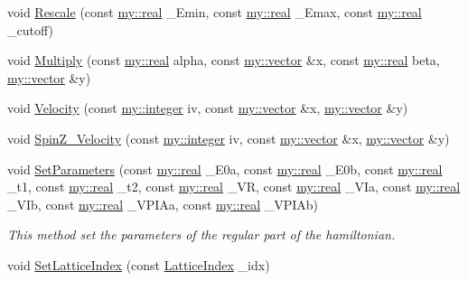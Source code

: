 \begin{DoxyCompactItemize}
\item 
void \hyperlink{classRegularHamiltonian_a47b8742fc581e4bafd1e1f2a5672e603}{Rescale} (const \hyperlink{namespacemy_ad61baeaeda728a4c48dd64f93e44a46c}{my\+::real} \+\_\+\+Emin, const \hyperlink{namespacemy_ad61baeaeda728a4c48dd64f93e44a46c}{my\+::real} \+\_\+\+Emax, const \hyperlink{namespacemy_ad61baeaeda728a4c48dd64f93e44a46c}{my\+::real} \+\_\+cutoff)
\item 
void \hyperlink{classRegularHamiltonian_a8107628da44cb22e0dbafd7c833264ef}{Multiply} (const \hyperlink{namespacemy_ad61baeaeda728a4c48dd64f93e44a46c}{my\+::real} alpha, const \hyperlink{namespacemy_ae5357c26097990af91eec62b547ff125}{my\+::vector} \&x, const \hyperlink{namespacemy_ad61baeaeda728a4c48dd64f93e44a46c}{my\+::real} beta, \hyperlink{namespacemy_ae5357c26097990af91eec62b547ff125}{my\+::vector} \&y)
\item 
void \hyperlink{classRegularHamiltonian_a1b337987086f6768ed170f072528666a}{Velocity} (const \hyperlink{namespacemy_a42365393c537edae1e89d20ff90d1923}{my\+::integer} iv, const \hyperlink{namespacemy_ae5357c26097990af91eec62b547ff125}{my\+::vector} \&x, \hyperlink{namespacemy_ae5357c26097990af91eec62b547ff125}{my\+::vector} \&y)
\item 
void \hyperlink{classRegularHamiltonian_a21f04c3c51e45a27d4869136d5153cda}{Spin\+Z\+\_\+\+Velocity} (const \hyperlink{namespacemy_a42365393c537edae1e89d20ff90d1923}{my\+::integer} iv, const \hyperlink{namespacemy_ae5357c26097990af91eec62b547ff125}{my\+::vector} \&x, \hyperlink{namespacemy_ae5357c26097990af91eec62b547ff125}{my\+::vector} \&y)
\item 
void \hyperlink{classRegularHamiltonian_a6ca575fbf813fdfc9fabe85ba85d22e6}{Set\+Parameters} (const \hyperlink{namespacemy_ad61baeaeda728a4c48dd64f93e44a46c}{my\+::real} \+\_\+\+E0a, const \hyperlink{namespacemy_ad61baeaeda728a4c48dd64f93e44a46c}{my\+::real} \+\_\+\+E0b, const \hyperlink{namespacemy_ad61baeaeda728a4c48dd64f93e44a46c}{my\+::real} \+\_\+t1, const \hyperlink{namespacemy_ad61baeaeda728a4c48dd64f93e44a46c}{my\+::real} \+\_\+t2, const \hyperlink{namespacemy_ad61baeaeda728a4c48dd64f93e44a46c}{my\+::real} \+\_\+\+VR, const \hyperlink{namespacemy_ad61baeaeda728a4c48dd64f93e44a46c}{my\+::real} \+\_\+\+V\+Ia, const \hyperlink{namespacemy_ad61baeaeda728a4c48dd64f93e44a46c}{my\+::real} \+\_\+\+V\+Ib, const \hyperlink{namespacemy_ad61baeaeda728a4c48dd64f93e44a46c}{my\+::real} \+\_\+\+V\+P\+I\+Aa, const \hyperlink{namespacemy_ad61baeaeda728a4c48dd64f93e44a46c}{my\+::real} \+\_\+\+V\+P\+I\+Ab)
\begin{DoxyCompactList}\small\item\em This method set the parameters of the regular part of the hamiltonian. \end{DoxyCompactList}\item 
void \hyperlink{classRegularHamiltonian_a18a7c9772e589fcae0cf941a9e9cf070}{Set\+Lattice\+Index} (const \hyperlink{classLatticeIndex}{Lattice\+Index} \+\_\+idx)
\end{DoxyCompactItemize}
